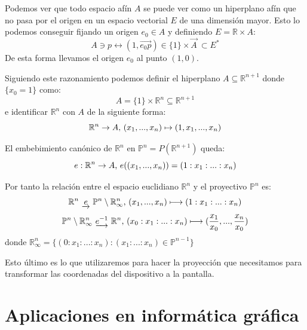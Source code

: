 \documentclass[a4paper,11pt, oneside]{book}
\begin{document}
Podemos ver que todo espacio afín $A$ se puede ver como un hiperplano afín que no pasa por el origen en un espacio vectorial $E$ de una dimensión mayor. Esto lo podemos conseguir fijando un origen $e_0 \in A$ y definiendo $E = \mathbb R \times A$:
\begin{equation}
	A \ni p \longleftrightarrow (1, \overrightarrow{e_0p}) \in \{1\}\times\overrightarrow{A} \ \subset E^*
\end{equation}
De esta forma llevamos el origen $e_0$ al punto $(1,0)$. 

Siguiendo este razonamiento podemos definir el hiperplano $A \subseteq \mathbb R^{n+1}$ donde $\{x_0 = 1\}$ como:
\begin{equation}
	A = \{1\} \times \mathbb R^n \subseteq \mathbb R^{n+1}
\end{equation}
e identificar $\mathbb R^n$ con $A$ de la siguiente forma:
\begin{equation}
	\mathbb R^n \rightarrow A \textup{,  } (x_1,...,x_n) \mapsto (1,x_1,...,x_n)
\end{equation}

El embebimiento canónico de $\mathbb R^n$ en $\mathbb P^n = P(\mathbb R^{n+1})$ queda:
\begin{equation}
	e: \mathbb R^n \rightarrow A \textup{,   } e((x_1,...,x_n)) = (1:x_1:...:x_n)
\end{equation}

Por tanto la relación entre el espacio euclidiano $\mathbb R^n$ y el proyectivo $\mathbb P^n$ es:
\begin{equation}
	\mathbb R^n \textup{ } \underrightarrow{e} \textup{ } \mathbb P^n \setminus \mathbb R^n_{\infty}\textup{,     } (x_1,...,x_n) \longmapsto (1:x_1:...:x_n)
\end{equation}
\begin{equation}\label{cambio_proyectivo}
	\mathbb P^n \setminus \mathbb R^n_{\infty} \textup{ }   \underrightarrow{e^{-1}} \textup{ }\mathbb R^n \textup{,     } (x_0:x_1:...:x_n) \longmapsto (\frac{x_1}{x_0},...,\frac{x_n}{x_0})
\end{equation}
donde $\mathbb R^n_{\infty} = \{(0:x_1:...:x_n) : (x_1:...:x_n) \in  \mathbb P^{n-1}\}$

Esto último es lo que utilizaremos para hacer la proyección que necesitamos para transformar las coordenadas del dispositivo a la pantalla.


\section{Aplicaciones en informática gráfica}
\end{document}

